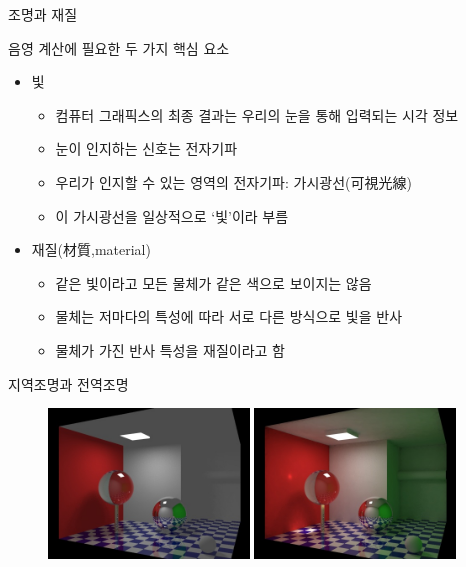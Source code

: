 \documentclass{beamer}
\begin{document}
\begin{frame}[fragile]{조명과 재질}

음영 계산에 필요한 두 가지 핵심 요소
\begin{itemize}
\item 빛
	\begin{itemize}
	\item 컴퓨터 그래픽스의 최종 결과는 우리의 눈을 통해 입력되는 시각 정보
	\item 눈이 인지하는 신호는 전자기파
	\item 우리가 인지할 수 있는 영역의 전자기파: 가시광선(可視光線)
	\item 이 가시광선을 일상적으로 `빛'이라 부름
	\end{itemize}
\item 재질(材質,material)
	\begin{itemize}
	\item 같은 빛이라고 모든 물체가 같은 색으로 보이지는 않음
	\item 물체는 저마다의 특성에 따라 서로 다른 방식으로 빛을 반사
	\item 물체가 가진 반사 특성을 재질이라고 함
	\end{itemize}
\end{itemize}

\end{frame}

\begin{frame}[fragile]{지역조명과 전역조명}

\begin{figure}[h!]
  \centering
    \includegraphics[height=4cm]{OGL_light/local_illumination.jpg}
    \includegraphics[height=4cm]{OGL_light/global_illumination.jpg}
\end{figure}

\end{frame}
\end{document}
